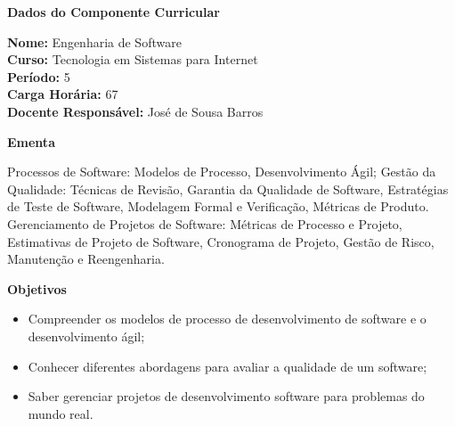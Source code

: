 

\begin{snugshade}\begin{center}\textbf{
	Dados do Componente Curricular
}\end{center}\end{snugshade}

\noindent 	\textbf{Nome:} Engenharia de Software
\\ 			\textbf{Curso:} Tecnologia em Sistemas para Internet
\\ 			\textbf{Período:} \unit{5}{\degree}
\\ 			\textbf{Carga Horária:} \unit{67}{\hour}
\\ 			\textbf{Docente Responsável:} José de Sousa Barros 



\begin{snugshade}\begin{center}\textbf{
    Ementa
\vphantom{q}}\end{center}\end{snugshade}

\noindent
Processos de Software: Modelos de Processo, Desenvolvimento Ágil;
Gestão da Qualidade: Técnicas de Revisão, Garantia da Qualidade de Software, Estratégias de Teste de Software, Modelagem Formal e Verificação, Métricas de Produto. Gerenciamento de Projetos de Software: Métricas de Processo e Projeto, Estimativas de Projeto de Software, Cronograma de Projeto, Gestão de Risco, Manutenção e Reengenharia.



\begin{snugshade}\begin{center}\textbf{
    Objetivos
}\end{center}\end{snugshade}


\begin{itemize}

\item Compreender os modelos de processo de desenvolvimento de software e o desenvolvimento ágil;
\item Conhecer diferentes abordagens para avaliar a qualidade de um software;
\item Saber gerenciar projetos de desenvolvimento software para problemas do mundo real.

\end{itemize}


